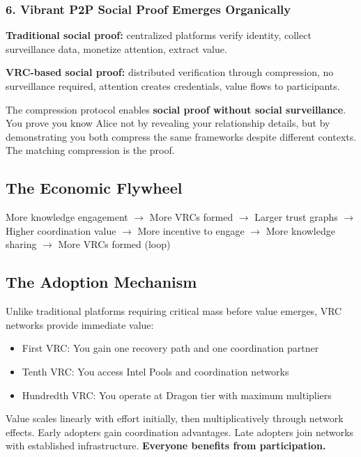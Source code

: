 \documentclass[11pt,a4paper]{article}
\theoremstyle{definition}
\begin{document}
\subsubsection{6. Vibrant P2P Social Proof Emerges Organically}

\textbf{Traditional social proof:} centralized platforms verify identity, collect surveillance data, monetize attention, extract value.

\textbf{VRC-based social proof:} distributed verification through compression, no surveillance required, attention creates credentials, value flows to participants.

The compression protocol enables \textbf{social proof without social surveillance}. You prove you know Alice not by revealing your relationship details, but by demonstrating you both compress the same frameworks despite different contexts. The matching compression is the proof.

\subsection{The Economic Flywheel}

More knowledge engagement $\rightarrow$ More VRCs formed $\rightarrow$ Larger trust graphs $\rightarrow$ Higher coordination value $\rightarrow$ More incentive to engage $\rightarrow$ More knowledge sharing $\rightarrow$ More VRCs formed (loop)

\subsection{The Adoption Mechanism}

Unlike traditional platforms requiring critical mass before value emerges, VRC networks provide immediate value:

\begin{itemize}
    \item First VRC: You gain one recovery path and one coordination partner
    \item Tenth VRC: You access Intel Pools and coordination networks
    \item Hundredth VRC: You operate at Dragon tier with maximum multipliers
\end{itemize}

Value scales linearly with effort initially, then multiplicatively through network effects. Early adopters gain coordination advantages. Late adopters join networks with established infrastructure. \textbf{Everyone benefits from participation.}
\end{document}
